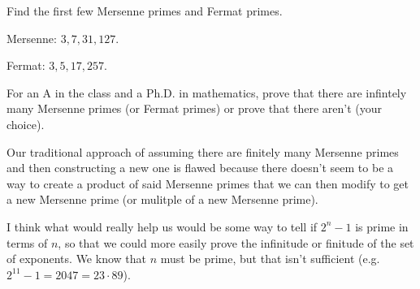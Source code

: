 \documentclass[../main.tex]{subfiles}
\begin{document}
\begin{ex} \label{2.44}
  Find the first few Mersenne primes and Fermat primes.
\end{ex}

Mersenne: $3, 7, 31, 127$.

Fermat: $3, 5, 17, 257$.



\begin{ex} \label{2.45}
  For an A in the class and a Ph.D. in mathematics, prove that there are infintely many Mersenne primes (or Fermat primes) or prove that there aren't (your choice).
\end{ex}

Our traditional approach of assuming there are finitely many Mersenne primes and then constructing a new one is flawed because there doesn't seem to be a way to create a product of said Mersenne primes that we can then modify to get a new Mersenne prime (or mulitple of a new Mersenne prime).

I think what would really help us would be some way to tell if $2^n-1$ is prime in terms of $n$, so that we could more easily prove the infinitude or finitude of the set of exponents. We know that $n$ must be prime, but that isn't sufficient (e.g. $2^11 - 1 = 2047 = 23 \cdot 89$).
\end{document}
